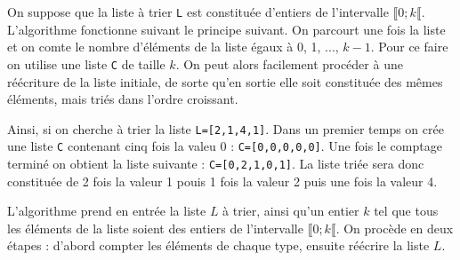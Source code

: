 \setcounter{numques}{0}

On suppose que la liste à trier \texttt{L} est constituée d’entiers de l’intervalle  $\llbracket 0; k \llbracket$. L’algorithme
fonctionne suivant le principe suivant. On parcourt une fois la liste et on comte le nombre d’éléments de
la liste égaux à 0, 1, ..., $k-1$. Pour ce faire on utilise une liste \texttt{C} de taille $k$. On peut alors facilement procéder à une
réécriture de la liste initiale, de sorte qu’en sortie elle soit constituée des mêmes éléments, mais triés dans l’ordre
croissant.

Ainsi, si on cherche à trier la liste \texttt{L=[2,1,4,1]}. Dans un premier temps on crée une liste \texttt{C} contenant cinq fois la valeu 0 : \texttt{C=[0,0,0,0,0]}. Une fois le comptage terminé on obtient la liste suivante : \texttt{C=[0,2,1,0,1]}. La liste triée sera donc constituée de 2 fois la valeur 1 pouis 1 fois la valeur 2 puis une fois la valeur 4.



L’algorithme prend en entrée la liste $L$ à trier, ainsi qu’un entier $k$ tel que tous les éléments de la
liste soient des entiers de l’intervalle $\llbracket 0; k \llbracket$. On procède en deux étapes : d’abord compter les éléments de chaque type,
ensuite réécrire la liste $L$.





